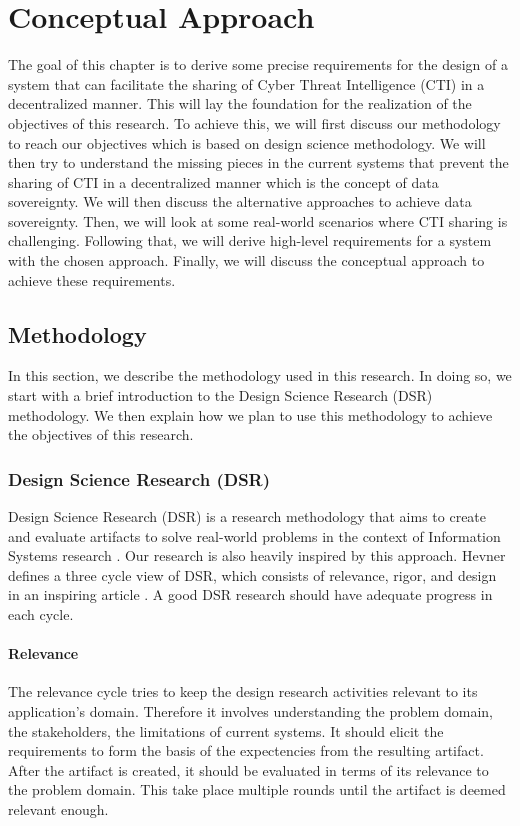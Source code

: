 \chapter{Conceptual Approach}
\label{chap:conceptual-approach}
The goal of this chapter is to derive some precise requirements for the design of a system that can facilitate the sharing of Cyber Threat Intelligence (CTI) in a decentralized manner. This will lay the foundation for the realization of the objectives of this research. To achieve this, we will first discuss our methodology to reach our objectives which is based on design science methodology. We will then try to understand the missing pieces in the current systems that prevent the sharing of CTI in a decentralized manner which is the concept of data sovereignty. We will then discuss the alternative approaches to achieve data sovereignty. Then, we will look at some real-world scenarios where CTI sharing is challenging. Following that, we will derive high-level requirements for a system with the chosen approach. Finally, we will discuss the conceptual approach to achieve these requirements.

\section{Methodology}
In this section, we describe the methodology used in this research. In doing so, we start with a brief introduction to the Design Science Research (DSR) methodology. We then explain how we plan to use this methodology to achieve the objectives of this research.

\subsection{Design Science Research (DSR)}
Design Science Research (DSR) is a research methodology that aims to create and evaluate artifacts to solve real-world problems in the context of Information Systems research \cite{hevner_three_2007}. Our research is also heavily inspired by this approach. Hevner defines a three cycle view of DSR, which consists of relevance, rigor, and design in an inspiring article \cite{hevner_three_2007}. A good DSR research should have adequate progress in each cycle. 
\subsubsection{Relevance}
The relevance cycle tries to keep the design research activities relevant to its application's domain. Therefore it involves understanding the problem domain, the stakeholders, the limitations of current systems. It should elicit the requirements to form the basis of the expectencies from the resulting artifact. After the artifact is created, it should be evaluated in terms of its relevance to the problem domain. This take place multiple rounds until the artifact is deemed relevant enough.
